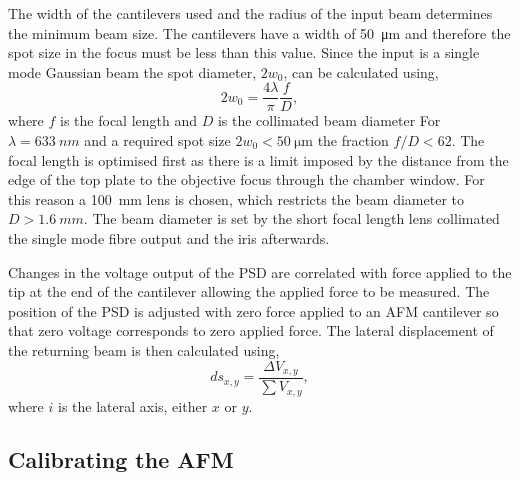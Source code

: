 \documentclass{article}
\begin{document}
The width of the cantilevers used and the radius of the input beam determines the minimum beam size. The cantilevers have a width of \SI{50}{\micro\metre} and therefore the spot size in the focus must be less than this value. Since the input is a single mode Gaussian beam the spot diameter, $2w_0$, can be calculated using,
\begin{equation} 2w_0 = \frac{4\lambda}{\pi}\frac{f}{D}, \end{equation}
where $f$ is the focal length and $D$ is the collimated beam diameter %
For $\lambda=\SI{633}{nm}$ and a required spot size $2w_0 < \SI{50}{\micro\metre}$ the fraction $f/D < 62$. The focal length is optimised first as there is a limit imposed by the distance from the edge of the top plate to the objective focus through the chamber window. For this reason a \SI{100}{mm} lens is chosen, which restricts the beam diameter to $D > \SI{1.6}{mm}$. The beam diameter is set by the short focal length lens collimated the single mode fibre output and the iris afterwards.

Changes in the voltage output of the PSD are correlated with force applied to the tip at the end of the cantilever allowing the applied force to be measured. The position of the PSD is adjusted with zero force applied to an AFM cantilever so that zero voltage corresponds to zero applied force. The lateral displacement of the returning beam is then calculated using,
\begin{equation}
ds_{x,y} = \frac{\Delta V_{x,y}}{\sum V_{x,y}},
\end{equation}
where $i$ is the lateral axis, either $x$ or $y$.

\subsection{Calibrating the AFM}
\end{document}
